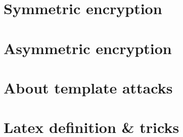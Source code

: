 \newcommand{\bld}[1]{
	\mbox{\boldmath $#1$}
		}

\renewcommand{\thechapter}{
	\Roman{chapter}
		}

\newcommand{\bigO}[1]{
 	\ensuremath{\mathop{}\mathopen{}\mathcal{O}\mathopen{}\left(#1\right)}
 		}	



\newcommand{\defi}[1]{  \textbf{Definition : #1 }}

	\let\oldUrl\url\renewcommand{\url}[1]{\href{#1}{$\mathscr{L}$ink}}
	
	\newcommand{\urlloki}[1]{ 
		\href{https://choucroutage.com/Papers/SideChannelAttacks/#1} 
			 {\raggedleft \color{blue}$\mathscr{L}ink$\color{black} \raggedright }     }
	
	\newcommand{\lokiquote}[1]{
		\cite{#1}, \urlloki{#1.pdf}
		}
	

\theoremstyle{definition}
\newtheorem*{mydef}{Definition}
\theoremstyle{plain}
\newtheorem*{mythm}{Theorem}
\theoremstyle{plain}
\newtheorem*{myprop}{Proposition}
\theoremstyle{plain}
	

	\maketitle			
	    
	    	\chapter{Symmetric encryption}	
	    		
	    			
	    		
	    		
	    			
	    			
	    			
	    	\chapter{Asymmetric encryption}
	    		
	    			
	    			
	    			
	    			
	    			
	    			
	    			
	    			
	    			
	    			
	    	\chapter{About template attacks}	
	    		
	\chapter{Latex definition \& tricks}
				
		
		
		\printindex

